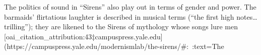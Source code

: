 \documentclass[12pt]{report}
\begin{document}
The politics of sound in “Sirens” also play out in terms of gender and power. The barmaids’ flirtatious laughter is described in musical terms (“the first high notes…trilling”); they are likened to the Sirens of mythology whose songs lure men [oai_citation_attribution:43‡campuspress.yale.edu](https://campuspress.yale.edu/modernismlab/the-sirens/#:~:text=The%
\end{document}
